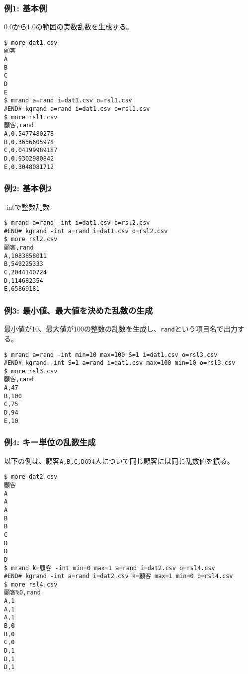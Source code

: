 \subsubsection*{例1: 基本例}

0.0から1.0の範囲の実数乱数を生成する。


\begin{Verbatim}[baselinestretch=0.7,frame=single]
$ more dat1.csv
顧客
A
B
C
D
E
$ mrand a=rand i=dat1.csv o=rsl1.csv
#END# kgrand a=rand i=dat1.csv o=rsl1.csv
$ more rsl1.csv
顧客,rand
A,0.5477480278
B,0.3656605978
C,0.04199989187
D,0.9302980842
E,0.3048081712
\end{Verbatim}
\subsubsection*{例2: 基本例2}

-intで整数乱数


\begin{Verbatim}[baselinestretch=0.7,frame=single]
$ mrand a=rand -int i=dat1.csv o=rsl2.csv
#END# kgrand -int a=rand i=dat1.csv o=rsl2.csv
$ more rsl2.csv
顧客,rand
A,1083858011
B,549225333
C,2044140724
D,114682354
E,65869181
\end{Verbatim}
\subsubsection*{例3: 最小値、最大値を決めた乱数の生成}

最小値が10、最大値が100の整数の乱数を生成し、\verb|rand|という項目名で出力する。


\begin{Verbatim}[baselinestretch=0.7,frame=single]
$ mrand a=rand -int min=10 max=100 S=1 i=dat1.csv o=rsl3.csv
#END# kgrand -int S=1 a=rand i=dat1.csv max=100 min=10 o=rsl3.csv
$ more rsl3.csv
顧客,rand
A,47
B,100
C,75
D,94
E,10
\end{Verbatim}
\subsubsection*{例4: キー単位の乱数生成}

以下の例は、顧客\verb|A,B,C,D|の4人について同じ顧客には同じ乱数値を振る。


\begin{Verbatim}[baselinestretch=0.7,frame=single]
$ more dat2.csv
顧客
A
A
A
B
B
C
D
D
D
$ mrand k=顧客 -int min=0 max=1 a=rand i=dat2.csv o=rsl4.csv
#END# kgrand -int a=rand i=dat2.csv k=顧客 max=1 min=0 o=rsl4.csv
$ more rsl4.csv
顧客%0,rand
A,1
A,1
A,1
B,0
B,0
C,0
D,1
D,1
D,1
\end{Verbatim}

